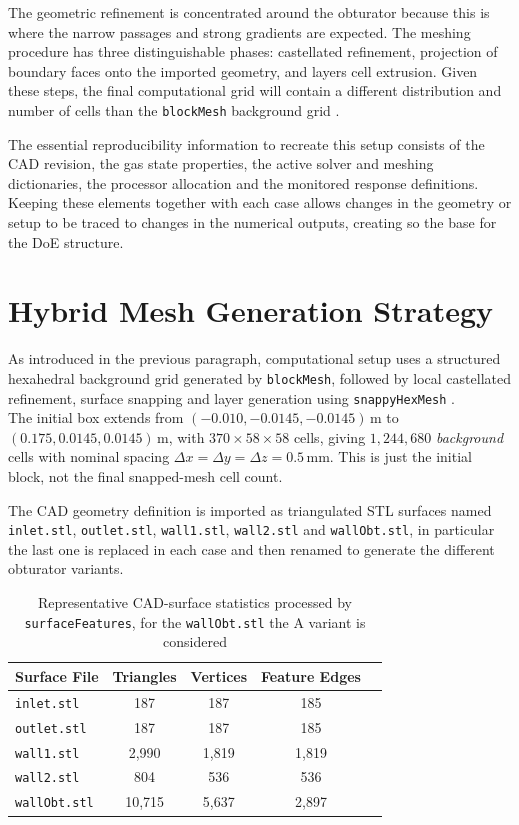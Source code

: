 The geometric refinement is concentrated around the obturator because this is where the narrow passages and strong gradients are expected. The meshing procedure has three distinguishable phases: castellated refinement, projection of boundary faces onto the imported geometry, and layers cell extrusion. Given these steps, the final computational grid will contain a different distribution and number of cells than the \texttt{blockMesh} background grid \cite{openfoam_user}.

The essential reproducibility information to recreate this setup consists of the CAD revision, the gas state properties, the active solver and meshing dictionaries, the processor allocation and the monitored response definitions. Keeping these elements together with each case allows changes in the geometry or setup to be traced to changes in the numerical outputs, creating so the base for the DoE structure.

\section{Hybrid Mesh Generation Strategy}
\label{sec:mesh_generation}

As introduced in the previous paragraph, computational setup uses a structured hexahedral background grid generated by \texttt{blockMesh}, followed by local castellated refinement, surface snapping and layer generation using \texttt{snappyHexMesh} \cite{openfoam_user}. \\
The initial box extends from $(-0.010,-0.0145,-0.0145)\,\mathrm{m}$ to $(0.175,0.0145,0.0145)\,\mathrm{m}$, with $370\times58\times58$ cells, giving $1{,}244{,}680$ \emph{background} cells with nominal spacing $\Delta x=\Delta y=\Delta z=0.5\,\mathrm{mm}$. This is just the initial block, not the final snapped-mesh cell count.

The CAD geometry definition is imported as triangulated STL surfaces named \texttt{inlet.stl}, \texttt{outlet.stl}, \texttt{wall1.stl}, \texttt{wall2.stl} and \texttt{wallObt.stl}, in particular the last one is replaced in each case and then renamed to generate the different obturator variants. 

\begin{table}[H]
\centering

\begin{tabular}{lcccc}
\toprule
\textbf{Surface File} & \textbf{Triangles} & \textbf{Vertices} & \textbf{Feature Edges} \\ %
\midrule
\texttt{inlet.stl}   & 187    & 187   & 185   \\ %
\texttt{outlet.stl}  & 187    & 187   & 185    \\ %
\texttt{wall1.stl}   & 2,990  & 1,819 & 1,819  \\ %
\texttt{wall2.stl}   & 804    & 536   & 536    \\ %
\texttt{wallObt.stl} & 10,715 & 5,637 & 2,897  \\ %
\bottomrule
\end{tabular}
\caption{Representative CAD-surface statistics processed by \texttt{surfaceFeatures}, for the \texttt{wallObt.stl} the A variant is considered} %
\label{tab:stl_stats}
\end{table}

